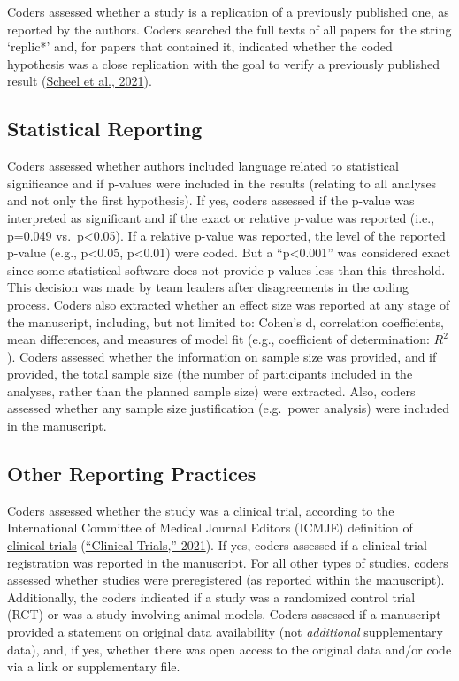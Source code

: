 \documentclass[]{cik}%
\begin{document}
Coders assessed whether a study is a replication of a previously
published one, as reported by the authors. Coders searched the full
texts of all papers for the string `replic*' and, for papers that
contained it, indicated whether the coded hypothesis was a close
replication with the goal to verify a previously published result
(\protect\hyperlink{ref-scheel_excess_2020}{Scheel et al., 2021}).

\hypertarget{statistical-reporting}{%
\subsection{Statistical Reporting}\label{statistical-reporting}}

Coders assessed whether authors included language related to statistical
significance and if p-values were included in the results (relating to
all analyses and not only the first hypothesis). If yes, coders assessed
if the p-value was interpreted as significant and if the exact or
relative p-value was reported (i.e., p=0.049 vs.~p\textless0.05). If a
relative p-value was reported, the level of the reported p-value (e.g.,
p\textless0.05, p\textless0.01) were coded. But a ``p\textless0.001''
was considered exact since some statistical software does not provide
p-values less than this threshold. This decision was made by team
leaders after disagreements in the coding process. Coders also extracted
whether an effect size was reported at any stage of the manuscript,
including, but not limited to: Cohen's d, correlation coefficients, mean
differences, and measures of model fit (e.g., coefficient of
determination: \(R^2\)). Coders assessed whether the information on
sample size was provided, and if provided, the total sample size (the
number of participants included in the analyses, rather than the planned
sample size) were extracted. Also, coders assessed whether any sample
size justification (e.g.~power analysis) were included in the
manuscript.

\hypertarget{other-reporting-practices}{%
\subsection{Other Reporting Practices}\label{other-reporting-practices}}

Coders assessed whether the study was a clinical trial, according to the
International Committee of Medical Journal Editors (ICMJE) definition of
\href{http://www.icmje.org/recommendations/browse/publishing-and-editorial-issues/clinical-trial-registration.html}{clinical
trials} (\protect\hyperlink{ref-icmje}{{``Clinical Trials,''} 2021}). If
yes, coders assessed if a clinical trial registration was reported in
the manuscript. For all other types of studies, coders assessed whether
studies were preregistered (as reported within the manuscript).
Additionally, the coders indicated if a study was a randomized control
trial (RCT) or was a study involving animal models. Coders assessed if a
manuscript provided a statement on original data availability (not
\emph{additional} supplementary data), and, if yes, whether there was
open access to the original data and/or code via a link or supplementary
file.
\end{document}
